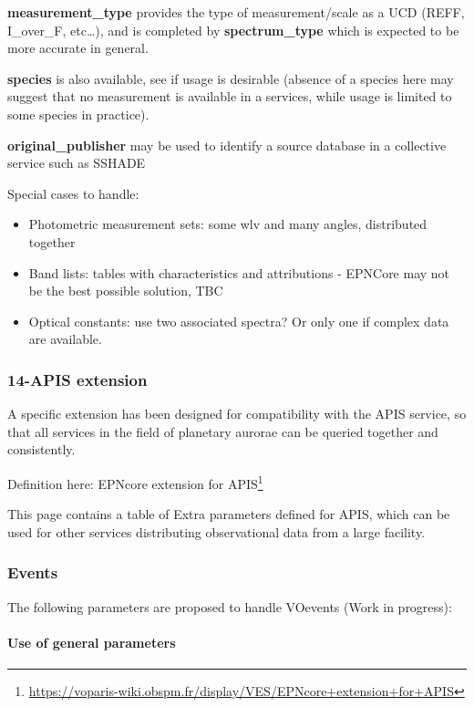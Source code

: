 \documentclass[11pt,a4paper]{ivoa}
\begin{document}
\textbf{measurement\_type} provides the type of measurement/scale as a UCD (REFF, I\_over\_F, etc…), and is completed by \textbf{spectrum\_type} which is expected to be more accurate in general.

\textbf{species} is also available, see if usage is desirable (absence of a species here may suggest that no measurement is available in a services, while usage is limited to some species in practice).

\textbf{original\_publisher }may be used to identify a source database in a collective service such as SSHADE


Special cases to handle:

\begin{itemize}

\item Photometric measurement sets: some wlv and many angles, distributed together

\item Band lists: tables with characteristics and attributions - EPNCore may not be the best possible solution, TBC

\item Optical constants: use two associated spectra? Or only one if complex data are available.

\end{itemize}

\subsubsection{14-APIS extension}

A specific extension has been designed for compatibility with the APIS service, so that all services in the field of planetary aurorae can be queried together and consistently.

Definition here: EPNcore extension for APIS\footnote{\url{https://voparis-wiki.obspm.fr/display/VES/EPNcore+extension+for+APIS}}

This page contains a table of Extra parameters defined for APIS, which can be used for other services distributing observational data from a large facility.

\subsubsection{Events}

The following parameters are proposed to handle VOevents (Work in progress):

\paragraph{Use of general parameters\textbf{ }}
\end{document}
